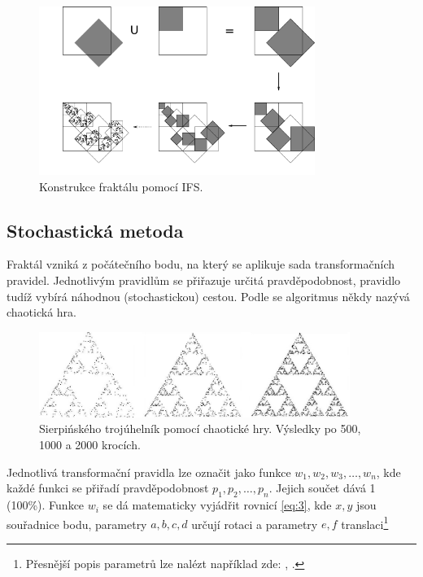 \documentclass[thesis=B, czech]{FITthesis}[2019/03/06]
\begin{document}

\begin{figure}[h]
    \centering
    \includegraphics[width=0.8\textwidth]{images/Ifs-construction.png}
        \caption{Konstrukce fraktálu pomocí IFS.}
    \label{fig:ifsConstruction}
\end{figure}

\subsection*{Stochastická metoda}

Fraktál vzniká z počátečního bodu, na který se aplikuje sada transformačních pravidel. Jednotlivým pravidlům se přiřazuje určitá pravděpodobnost, pravidlo tudíž vybírá náhodnou (stochastickou) cestou. Podle \cite{sixta} se algoritmus někdy nazývá chaotická hra.

\begin{figure}[h]
    \centering
    \includegraphics[width=0.9\textwidth]{images/sierpinskyChaos.jpg}
        \caption{Sierpińského trojúhelník pomocí chaotické hry. Výsledky po 500, 1000 a 2000 krocích.}
    \label{fig:chaosGame}
\end{figure}

\newpage

Jednotlivá transformační pravidla lze označit jako funkce  $w_{1},w_{2},w_{3},\ldots,w_{n}$, kde každé funkci se přiřadí pravděpodobnost $p_{1},p_{2},\ldots,p_{n}$. Jejich součet dává 1 (100\%). Funkce $w_i$ se dá matematicky vyjádřit rovnicí \ref{eq:3}, kde  $x, y$ jsou souřadnice bodu, parametry $a, b, c, d$ určují rotaci a parametry $e, f$ translaci\footnote{Přesnější popis parametrů lze nalézt například zde: \cite{bourke}, \cite{itnetwork}.}
\end{document}
